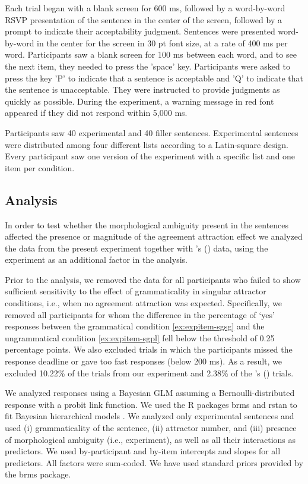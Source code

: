 \documentclass[times,linguex]{glossa}\usepackage[]{graphicx}\usepackage[]{color}
\begin{document}
Each trial began with a blank screen for 600 ms, followed by a word-by-word RSVP presentation of the sentence in the center of the screen, followed by a prompt to indicate their acceptability judgment. Sentences were presented word-by-word in the center for the screen in 30 pt font size, at a rate of 400 ms per word. Participants saw a blank screen for 100 ms between each word, and to see the next item, they needed to press the 'space' key. Participants were asked to press the key 'P' to indicate that a sentence is acceptable and 'Q' to indicate that the sentence is unacceptable. They were instructed to provide judgments as quickly as possible. During the experiment, a warning message in red font appeared if they did not respond within 5,000 ms.

Participants saw 40 experimental and 40 filler sentences. Experimental sentences were distributed among four different lists according to a Latin-square design. Every participant saw one version of the experiment with a specific list and one item per condition.

\subsection{Analysis}

In order to test whether the morphological ambiguity present in the \citet{LagoEtAl:2018} sentences affected the presence or magnitude of the agreement attraction effect we analyzed the data from the present experiment together with \citeauthor{LagoEtAl:2018}'s (\citeyear{LagoEtAl:2018}) data, using the experiment as an additional factor in the analysis.
  
Prior to the analysis, we removed the data for all participants who failed to show sufficient sensitivity to the effect of grammaticality in singular attractor conditions, i.e., when no agreement attraction was expected. Specifically, we removed all participants for whom the difference in the percentage of `yes' responses between the grammatical condition \ref{ex:expitem-sgsg} and the ungrammatical condition \ref{ex:expitem-sgpl} fell below the threshold of 0.25 percentage points. We also excluded trials in which the participants missed the response deadline or gave too fast responses (below 200 ms). As a result, we excluded 10.22\% of the trials from our experiment and 2.38\% of the \citeauthor{LagoEtAl:2018}'s (\citeyear{LagoEtAl:2018}) trials. 

We analyzed responses using a Bayesian GLM assuming a Bernoulli-distributed response with a probit link function.  We used the R packages brms \citep{brms} and rstan \citep{rstan} to fit Bayesian hierarchical models \citep[e.g.]{GelmanHill:2007, NicenboimVasishth:2016}. We analyzed only experimental sentences and used (i) grammaticality of the sentence, (ii) attractor number, and (iii) presence of morphological ambiguity (i.e., experiment), as well as all their interactions as predictors. We used by-participant and by-item intercepts and slopes for all predictors. All factors were sum-coded. We have used standard priors provided by the brms package. 
\end{document}
